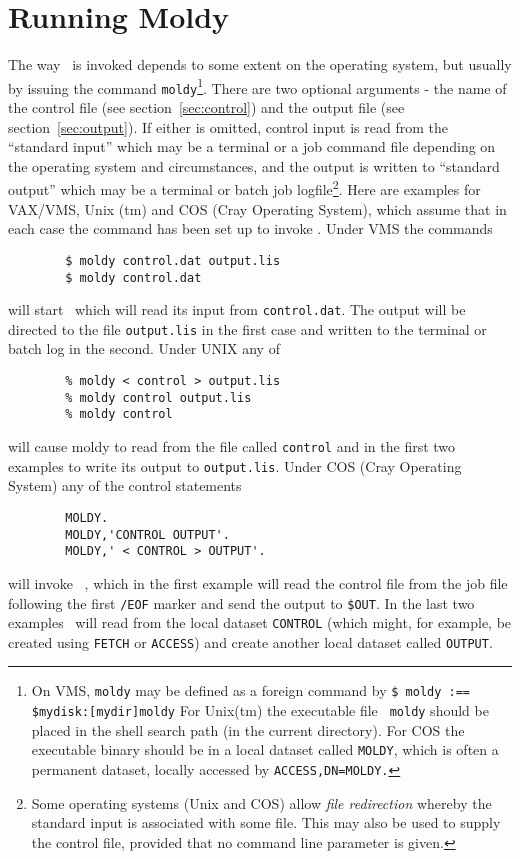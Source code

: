 \chapter{Running Moldy}

The way \moldy\  is invoked depends to some extent on the operating
system, but usually by issuing the command \verb'moldy'\footnote{On
VMS, {\tt moldy} may be defined as a foreign command by {\tt \$ moldy
:== \$mydisk:[mydir]moldy} For Unix(tm) the executable file {\tt
moldy} should be placed in the shell search path (\eg in the current
directory). For COS the executable binary should be in a local dataset
called {\tt MOLDY}, which is often a permanent dataset, locally
accessed by {\tt ACCESS,DN=MOLDY.}}.  There are two optional arguments
- the name of the control file (see section~\ref{sec:control}) and the
output file (see section~\ref{sec:output}).  If either is omitted,
control input is read from the ``standard input'' which may be a
terminal or a job command file depending on the operating system and
circumstances, and the output is written to ``standard output'' which
may be a terminal or batch job logfile\footnote{Some operating systems
(Unix and COS) allow {\em file redirection} whereby the standard input
is associated with some file.  This may also be used to supply the
control file, provided that no command line parameter is given.}.
Here are examples for VAX/VMS, Unix (tm) and COS (Cray Operating
System), which assume that in each case the command has been set up to
invoke \moldy. Under VMS the commands
\begin{verbatim}
        $ moldy control.dat output.lis
        $ moldy control.dat
\end{verbatim}
will start \moldy\  which will read its input from \verb'control.dat'.
The output will be directed to the file \verb'output.lis' in the first
case and written to the terminal or batch log in the second.  Under
UNIX any of
\begin{verbatim}
        % moldy < control > output.lis
        % moldy control output.lis
        % moldy control
\end{verbatim}
will cause moldy to read from the file called \verb'control' and in
the first two examples to write its output to \verb'output.lis'.
Under COS (Cray Operating System) any of the control statements
\begin{verbatim}
        MOLDY.
        MOLDY,'CONTROL OUTPUT'.
        MOLDY,' < CONTROL > OUTPUT'.
\end{verbatim}
will invoke \moldy\ , which in the first example will read the control
file from the job file following the first \verb'/EOF' marker and send
the output to \verb'$OUT'.  In the last two examples
\moldy\  will read from the local dataset \verb'CONTROL' (which might, for
example, be created using \verb'FETCH' or \verb'ACCESS') and create
another local dataset called \verb'OUTPUT'.


